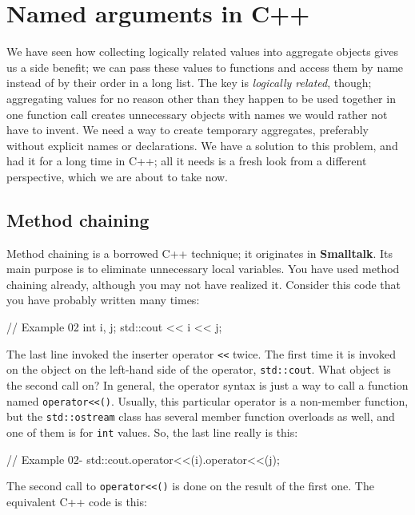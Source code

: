 \section{Named arguments in C++}

We have seen how collecting logically related values into aggregate objects gives us a side benefit; we can pass these values to functions and access them by name instead of by their order in a long list. The key is \emph{logically related}, though; aggregating values for no reason other than they happen to be used together in one function call creates unnecessary objects with names we would rather not have to invent. We need a way to create temporary aggregates, preferably without explicit names or declarations. We have a solution to this problem, and had it for a long time in C++; all it needs is a fresh look from a different perspective, which we are about to take now.

\subsection{Method chaining}

Method chaining is a borrowed C++ technique; it originates in \textbf{Smalltalk}. Its main purpose is to eliminate unnecessary local variables. You have used method chaining already, although you may not have realized it. Consider this code that you have probably written many times:

\begin{code}
// Example 02
int i, j;
std::cout << i << j;
\end{code}

The last line invoked the inserter operator \texttt{\textless{}\textless{}} twice. The first time it is invoked on the object on the left-hand side of the operator, \texttt{std::cout}. What object is the second call on? In general, the operator syntax is just a way to call a function named \texttt{operator\textless{}\textless{}()}. Usually, this particular operator is a non-member function, but the \texttt{std::ostream} class has several member function overloads as well, and one of them is for \texttt{int} values. So, the last line really is this:

\begin{code}
// Example 02-
std::cout.operator<<(i).operator<<(j);
\end{code}

The second call to \texttt{operator\textless{}\textless{}()} is done on the result of the first one. The equivalent C++ code is this:


